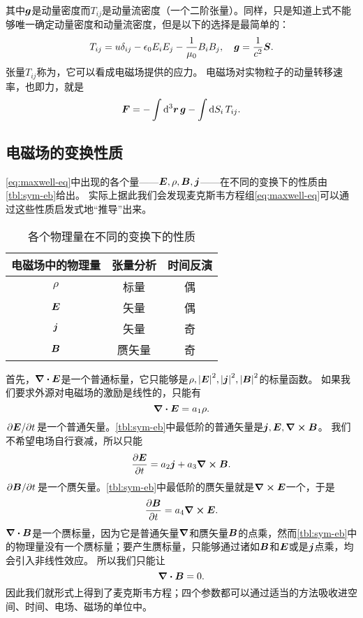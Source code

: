 其中$\vb*{g}$是动量密度而$T_{ij}$是动量流密度（一个二阶张量）。同样，只是知道上式不能够唯一确定动量密度和动量流密度，但是以下的选择是最简单的：
\begin{equation}
    T_{ij} = u \delta_{ij} - \epsilon_0 E_i E_j - \frac{1}{\mu_0} B_i B_j, \quad \vb*{g} = \frac{1}{c^2} \vb*{S}.
\end{equation}
张量$T_{ij}$称为，它可以看成电磁场提供的应力。
电磁场对实物粒子的动量转移速率，也即力，就是
\begin{equation}
    \vb*{F} = - \int \dd[3]{\vb*{r}} \vb*{g} - \int \dd{S_i} T_{ij}.
\end{equation}

\subsection{电磁场的变换性质}

\eqref{eq:maxwell-eq}中出现的各个量——$\vb*{E}, \rho, \vb*{B}, \vb*{j}$——在不同的变换下的性质由\autoref{tbl:sym-eb}给出。
实际上据此我们会发现麦克斯韦方程组\eqref{eq:maxwell-eq}可以通过这些性质启发式地“推导”出来。

\begin{table}
    \centering
    \caption{各个物理量在不同的变换下的性质}
    \label{tbl:sym-eb}
    \begin{tabular}[c]{ccc}
        \toprule
        电磁场中的物理量 & 张量分析 & 时间反演 \\
        \midrule
        $\rho$ & 标量 & 偶 \\
        $\vb*{E}$ & 矢量 & 偶 \\
        $\vb*{j}$ & 矢量 & 奇 \\
        $\vb*{B}$ & 赝矢量 & 奇 \\
        \bottomrule
    \end{tabular}
\end{table}

首先，$\div{\vb*{E}}$是一个普通标量，它只能够是$\rho, \abs{\vb*{E}}^2, \abs{\vb*{j}}^2, \abs{\vb*{B}}^2$的标量函数。
如果我们要求外源对电磁场的激励是线性的，只能有
\[
    \div{\vb*{E}} = a_1 \rho.
\]
$\pdv*{\vb*{E}}{t}$是一个普通矢量。\autoref{tbl:sym-eb}中最低阶的普通矢量是$\vb*{j}, \vb*{E}, \curl{\vb*{B}}$。
我们不希望电场自行衰减，所以只能
\[
    \pdv{\vb*{E}}{t} = a_2 \vb*{j} + a_3 \curl{\vb*{B}}.
\]
$\pdv*{\vb*{B}}{t}$是一个赝矢量。\autoref{tbl:sym-eb}中最低阶的赝矢量就是$\curl{\vb*{E}}$一个，于是
\[
    \pdv{\vb*{B}}{t} = a_4 \curl{\vb*{E}}.
\]
$\div{\vb*{B}}$是一个赝标量，因为它是普通矢量$\grad$和赝矢量$\vb*{B}$的点乘，然而\autoref{tbl:sym-eb}中的物理量没有一个赝标量；要产生赝标量，只能够通过诸如$\vb*{B}$和$\vb*{E}$或是$\vb*{j}$点乘，均会引入非线性效应。
所以我们只能让
\[
    \div{\vb*{B}} = 0.
\]
因此我们就形式上得到了麦克斯韦方程；四个参数都可以通过适当的方法吸收进空间、时间、电场、磁场的单位中。

